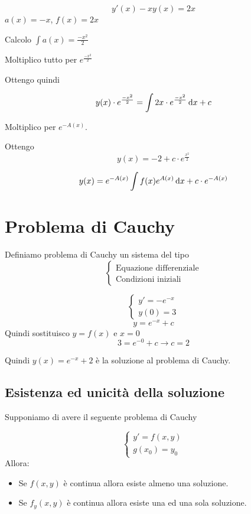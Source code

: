 \begin{example}
$$y'(x)-xy(x)=2x$$
$a(x) = -x$, $f(x) = 2x$

Calcolo $\int a(x) = \frac{-x^2}{2}$

Moltiplico tutto per $e^{\frac{-x^2}{2}}$

Ottengo quindi

$$y(x)\cdot e^{\frac{-x^2}{2}} = \int 2x \cdot e^{\frac{-x^2}{2}} \mathop{}\!\mathrm{d} x + c$$

Moltiplico per $e^{-A(x)}$.

Ottengo $$y(x) = -2+c\cdot e^{\frac{x^2}{2}}$$
\end{example}

\begin{theorem}
$$
y(x) = e^{-A(x)} \int f(x) e^{A(x)} \mathop{}\!\mathrm{d} x + c \cdot e^{-A(x)}
$$
\end{theorem}

\section{Problema di Cauchy}

Definiamo problema di Cauchy un sistema del tipo
$$
\begin{cases}
\text{Equazione differenziale} \\
\text{Condizioni iniziali}
\end{cases}
$$

\begin{example}
$$
\begin{cases}
y' = -e^{-x} \\
y(0) = 3
\end{cases}
$$
$$
y = e^{-x} + c
$$
Quindi sostituisco $y=f(x)$ e $x=0$
$$
3 = e^{-0} + c \to
c = 2
$$

Quindi $y(x)=e^{-x}+2$ è la soluzione al problema di Cauchy.
\end{example}

\subsection{Esistenza ed unicità della soluzione}

Supponiamo di avere il seguente problema di Cauchy

$$
\begin{cases}
y' = f(x,y) \\
g(x_0) = y_0
\end{cases}
$$
Allora:
\begin{itemize}
\item Se $f(x,y)$ è continua allora esiste almeno una soluzione.
\item Se $f_y(x,y)$ è continua allora esiste una ed una sola soluzione.
\end{itemize}